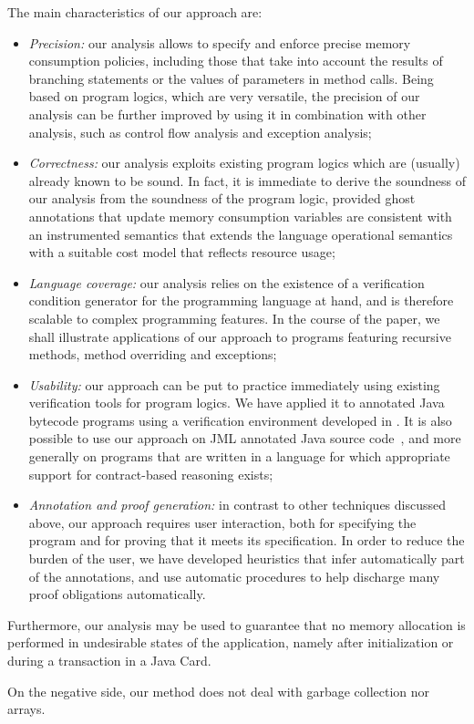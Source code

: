 The main characteristics of our approach are:
\begin{itemize}
\item \emph{Precision:} our analysis allows to specify and enforce
precise memory consumption policies, including those that take
into account the results of branching statements or the values of
parameters in method calls. Being based on program logics, which are
very versatile, the precision of our analysis can be further improved
by using it in combination with other analysis, such as control flow
analysis and exception analysis;


\item \emph{Correctness:} our analysis exploits existing program logics
which are (usually) already known to be sound. In fact, it is immediate
to derive the soundness of our analysis from the soundness of the program
logic, provided ghost annotations that update memory consumption variables
are consistent with an instrumented semantics that  extends the language
operational semantics with a suitable cost model that reflects resource
usage;

\item \emph{Language coverage:} our analysis relies on the existence
of a verification condition generator for the programming language at
hand, and is therefore scalable to complex programming features.  In
the course of the paper, we shall illustrate applications of our
approach to programs featuring recursive methods, method
overriding and exceptions;


\item \emph{Usability:} our approach can be put to practice
immediately using existing verification tools for program logics. We
have applied it to annotated Java bytecode programs using a
verification environment developed in \cite{LM05:acc}. It is also
possible to use our approach on JML annotated Java source
code~\cite{BRL-JACK}, and more generally on programs that are written
in a language for which appropriate support for contract-based
reasoning exists;




\item \emph{Annotation and proof generation:} in contrast to other
techniques discussed above, our approach requires user interaction,
both for specifying the program and for proving that it meets its
specification.  In order to reduce the burden of the user, we have
developed heuristics that infer automatically part of the annotations,
and use automatic procedures to help discharge many proof obligations
automatically.
\end{itemize}
Furthermore, our analysis may be used to guarantee that no memory
allocation is performed in undesirable states of the application,
namely after initialization or during a transaction in a Java Card.

On the negative side, our method does not deal with garbage collection 
nor arrays.


